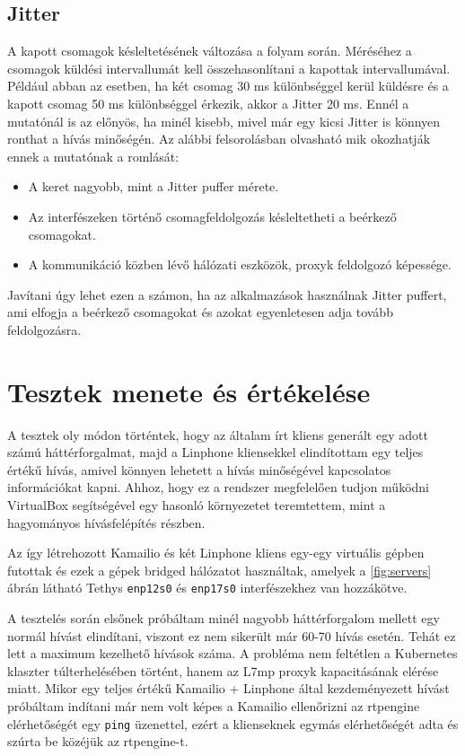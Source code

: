 \subsection{Jitter}

A kapott csomagok késleltetésének változása a folyam során. Méréséhez a csomagok küldési 
intervallumát kell összehasonlítani a kapottak intervallumával. Például abban az esetben, 
ha két csomag 30 ms különbséggel kerül küldésre és a kapott csomag 50 ms különbséggel 
érkezik, akkor a Jitter 20 ms. Ennél a mutatónál is az előnyös, ha minél kisebb, mivel 
már egy kicsi Jitter is könnyen ronthat a hívás minőségén. Az alábbi felsorolásban 
olvasható mik okozhatják ennek a mutatónak a romlását:

\begin{itemize}
	\item A keret nagyobb, mint a Jitter puffer mérete. 
	\item Az interfészeken történő csomagfeldolgozás késleltetheti a beérkező csomagokat.
	\item A kommunikáció közben lévő hálózati eszközök, proxyk feldolgozó képessége. 
\end{itemize}

Javítani úgy lehet ezen a számon, ha az alkalmazások használnak Jitter puffert, ami 
elfogja a beérkező csomagokat és azokat egyenletesen adja tovább feldolgozásra. 

\section{Tesztek menete és értékelése}

A tesztek oly módon történtek, hogy az általam írt kliens generált egy adott számú 
háttérforgalmat, majd a Linphone kliensekkel elindítottam egy teljes értékű hívás, amivel 
könnyen lehetett a hívás minőségével kapcsolatos információkat kapni. Ahhoz, hogy ez a 
rendszer megfelelően tudjon működni VirtualBox segítségével egy hasonló környezetet 
teremtettem, mint a hagyományos hívásfelépítés részben.

Az így létrehozott Kamailio és két Linphone kliens egy-egy virtuális gépben futottak és 
ezek a gépek bridged hálózatot használtak, amelyek a \ref{fig:servers} ábrán látható 
Tethys \texttt{enp12s0} és \texttt{enp17s0} interfészekhez van hozzákötve. 

A tesztelés során elsőnek próbáltam minél nagyobb háttérforgalom mellett egy normál 
hívást elindítani, viszont ez nem sikerült már 60-70 hívás esetén. Tehát ez lett a 
maximum kezelhető hívások száma. A probléma nem feltétlen a Kubernetes klaszter 
túlterhelésében történt, hanem az L7mp proxyk kapacitásának elérése miatt. Mikor egy 
teljes értékű Kamailio + Linphone által kezdeményezett hívást próbáltam indítani már nem 
volt képes a Kamailio ellenőrizni az rtpengine elérhetőségét egy \texttt{ping} üzenettel, 
ezért a klienseknek egymás elérhetőségét adta és szúrta be közéjük az rtpengine-t.

